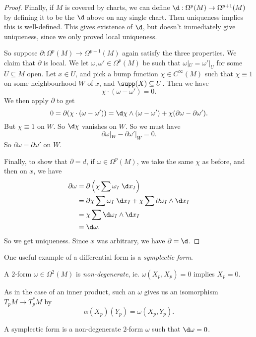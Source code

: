 \documentclass[a4paper]{article}
\begin{document}
\begin{proof}
  Finally, if $M$ is covered by charts, we can define $\d: \Omega^p(M) \to \Omega^{p + 1}(M)$ by defining it to be the $\d$ above on any single chart. Then uniqueness implies this is well-defined. This gives existence of $\d$, but doesn't immediately give uniqueness, since we only proved local uniqueness.

  So suppose $\partial: \Omega^p(M) \to \Omega^{p + 1}(M)$ again satisfy the three properties. We claim that $\partial$ is local. We let $\omega, \omega' \in \Omega^p(M)$ be such that $\omega|_U = \omega'|_U$ for some $U \subseteq M$ open. Let $x \in U$, and pick a bump function $\chi \in C^\infty(M)$ such that $\chi \equiv 1$ on some neighbourhood $W$ of $x$, and $\supp(X) \subseteq U$. Then we have
  \[
    \chi \cdot (\omega - \omega') = 0.
  \]
  We then apply $\partial$ to get
  \[
    0 = \partial(\chi \cdot(\omega - \omega')) = \d \chi \wedge (\omega - \omega') + \chi(\partial \omega - \partial\omega').
  \]
  But $\chi \equiv 1$ on $W$. So $\d \chi$ vanishes on $W$. So we must have
  \[
    \partial \omega|_W - \partial \omega'|_W = 0.
  \]
  So $\partial \omega = \partial \omega'$ on $W$.

  Finally, to show that $\partial = d$, if $\omega \in \Omega^p(M)$, we take the same $\chi$ as before, and then on $x$, we have
  \begin{align*}
    \partial \omega &= \partial\left(\chi\sum \omega_I \;\d x_I\right) \\
    &= \partial \chi \sum \omega_I \;\d x_I + \chi \sum \partial \omega_I \wedge \d x_I \\
    &= \chi \sum \d \omega_I \wedge \d x_I\\
    &= \d \omega.
  \end{align*}
  So we get uniqueness. Since $x$ was arbitrary, we have $\partial = \d$.
\end{proof}

One useful example of a differential form is a \emph{symplectic form}.
\begin{defi}
  A $2$-form $\omega \in \Omega^2(M)$ is \emph{non-degenerate}, ie. $\omega(X_p, X_p) = 0$ implies $X_p = 0$.
\end{defi}
As in the case of an inner product, such an $\omega$ gives us an isomorphism $T_p M \to T^*_p M$ by
\[
  \alpha(X_p)(Y_p) = \omega(X_p, Y_p).
\]
\begin{defi}
  A symplectic form is a non-degenerate $2$-form $\omega$ such that $\d \omega = 0$.
\end{defi}
\end{document}
